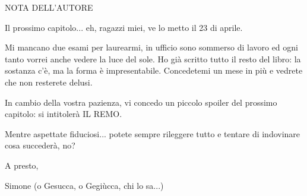 NOTA DELL'AUTORE

Il prossimo capitolo... eh, ragazzi miei, ve lo metto il 23 di aprile.

Mi mancano due esami per laurearmi, in ufficio sono sommerso di lavoro ed ogni tanto vorrei anche vedere la luce del sole. Ho già scritto tutto il resto del libro: la sostanza c'è, ma la forma è impresentabile. Concedetemi un mese in più e vedrete che non resterete delusi.

In cambio della vostra pazienza, vi concedo un piccolo spoiler del prossimo capitolo: si intitolerà IL REMO.

Mentre aspettate fiduciosi... potete sempre rileggere tutto e tentare di indovinare cosa succederà, no?

A presto,

Simone (o Gesucca, o Gegiùcca, chi lo sa...)



